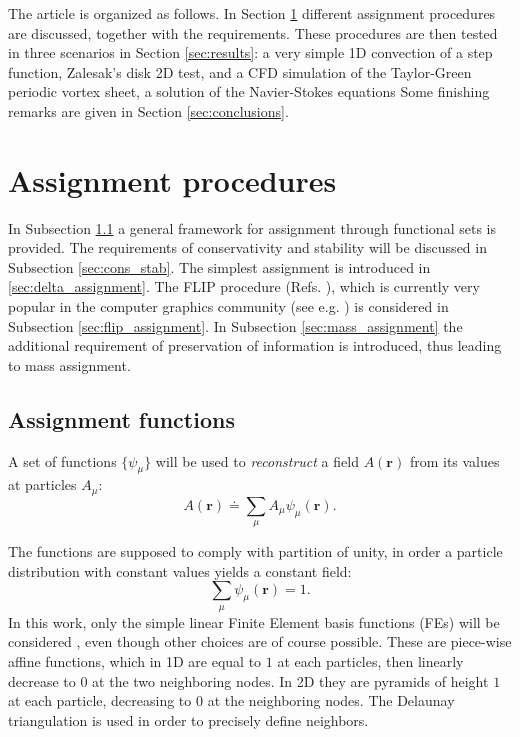 \documentclass{ws-ijcm}
\newcommand{\bfr}{\mathbf{r}}
\begin{document}
The article is organized as follows. In Section \ref{sec:assignment}
different assignment procedures are discussed, together with the
requirements.
%
These procedures are then tested in three scenarios in Section
\ref{sec:results}: a very simple 1D convection of a step function,
Zalesak's disk 2D test, and a CFD simulation of the Taylor-Green
periodic vortex sheet, a solution of the Navier-Stokes equations
%
Some finishing remarks are given in Section \ref{sec:conclusions}.



\section{Assignment procedures}
\label{sec:assignment}

In Subsection \ref{sec:functions} a general framework for assignment
through functional sets is provided. The requirements of
conservativity and stability will be discussed in Subsection
\ref{sec:cons_stab}. The simplest assignment is introduced in
\ref{sec:delta_assignment}. The FLIP procedure
(Refs. \cite{brackbill1986flip,brackbill1988}), which is currently very
popular in the computer graphics community (see
e.g. \cite{bridson_2015}) is considered in Subsection
\ref{sec:flip_assignment}.  In Subsection \ref{sec:mass_assignment}
the additional requirement of preservation of information is
introduced, thus leading to mass assignment.


\subsection{Assignment functions}
\label{sec:functions}


A set of functions $\{\psi_\mu\}$ will be used to \emph{reconstruct} a
field $A(\bfr)$ from its values at particles $A_\mu$:
\begin{equation}
\label{eq:part_interp}
A(\bfr) \doteq \sum_\mu A_\mu \psi_\mu ( \bfr ) .
\end{equation}

The functions are supposed to comply with partition of unity, in order
a particle distribution with constant values yields a constant field:
\begin{equation}
\label{eq:sum_psi}
\sum_\mu \psi_\mu(\bfr) = 1 .
\end{equation}
In this work, only the simple linear Finite Element basis functions
(FEs) will be considered , even though other choices are of course
possible. These are piece-wise affine functions, which in 1D are equal
to $1$ at each particles, then linearly decrease to $0$ at the two
neighboring nodes.  In 2D they are pyramids of height $1$ at each
particle, decreasing to $0$ at the neighboring nodes. The Delaunay
triangulation is used in order to precisely define neighbors.
\end{document}
